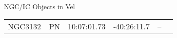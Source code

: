 \begin{block}{NGC/IC Objects in Vel}
  \centering
  \begin{tabularx}{\textwidth}{llrrll} \toprule 
    NGC3132 & PN & 10:07:01.73 & -40:26:11.7  & -- \\ 
  \end{tabularx}
\end{block}